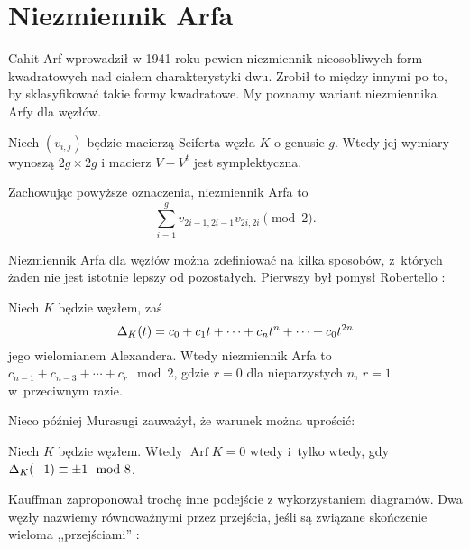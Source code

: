 
\section{Niezmiennik Arfa}
%

Cahit Arf wprowadził w 1941 roku pewien niezmiennik nieosobliwych form kwadratowych nad ciałem charakterystyki dwu.
%
Zrobił to między innymi po to, by sklasyfikować takie formy kwadratowe.
My poznamy wariant niezmiennika Arfy dla węzłów.

Niech $(v_{i,j})$ będzie macierzą Seiferta węzła $K$ o genusie $g$.
Wtedy jej wymiary wynoszą $2g \times 2g$ i macierz $V-V^t$ jest symplektyczna.

\begin{definition}
    Zachowując powyższe oznaczenia, niezmiennik Arfa to
    \begin{equation}
        \sum^g_{i=1}v_{2i-1,2i-1}v_{2i,2i} \pmod 2.
    \end{equation}
\end{definition}

Niezmiennik Arfa dla węzłów można zdefiniować na kilka sposobów, z~których żaden nie jest istotnie lepszy od pozostałych.
Pierwszy był pomysł Robertello \cite{robertello65}:
%

\begin{proposition}[Robertello, 1965]
    Niech $K$ będzie węzłem, zaś
    \begin{equation}
        \Delta_K(t)=c_{0}+c_{1}t+\cdots +c_{n}t^{n}+\cdots +c_{0}t^{2n}
    \end{equation}
    jego wielomianem Alexandera.
    Wtedy niezmiennik Arfa to $c_{n-1}+c_{n-3}+\cdots +c_{r} \mod 2$, gdzie $r = 0$ dla nieparzystych $n$, $r = 1$ w~przeciwnym razie.
\end{proposition}

Nieco później Murasugi \cite{murasugi69} zauważył, że warunek można uprościć:
%

\begin{proposition}[Murasugi, 1969]
    \label{prp:arf_murasugi}
    Niech $K$ będzie węzłem.
    Wtedy $\operatorname{Arf} K = 0$ wtedy i~tylko wtedy, gdy $\Delta_K(-1) \equiv \pm 1 \mod 8$.
\end{proposition}

Kauffman zaproponował trochę inne podejście z wykorzystaniem diagramów.
%
Dwa węzły nazwiemy równoważnymi przez przejścia, jeśli są związane skończenie wieloma ,,przejściami'' \cite[s. 143]{kauffman83}:
\begin{comment}
\[
    \LargeTwoPassMoveA \cong \LargeTwoPassMoveB
    \quad\mbox{albo}\quad
    \LargeTwoPassMoveC \cong \LargeTwoPassMoveD
\]
\end{comment}

